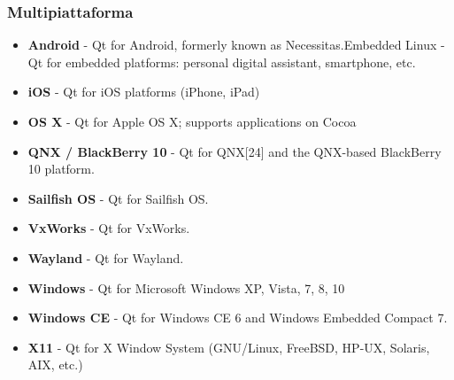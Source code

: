 \documentclass{beamer}
\begin{document}
\begin{frame}
	\frametitle{Multipiattaforma}
	\begin{itemize}
		\item \textbf{Android} - Qt for Android, formerly known as Necessitas.Embedded Linux - Qt for embedded platforms: personal digital assistant, smartphone,
		etc.
		\item \textbf{iOS} - Qt for iOS platforms (iPhone, iPad)
		\item \textbf{OS X} - Qt for Apple OS X; supports applications on Cocoa
		\item \textbf{QNX / BlackBerry 10} - Qt for QNX[24] and the QNX-based BlackBerry 10 platform.
		\item \textbf{Sailfish OS} - Qt for Sailfish OS.
		\item \textbf{VxWorks} - Qt for VxWorks.
		\item \textbf{Wayland} - Qt for Wayland.
		\item \textbf{Windows} - Qt for Microsoft Windows XP, Vista, 7, 8, 10
		\item \textbf{Windows CE} - Qt for Windows CE 6 and Windows Embedded Compact 7.
		\item \textbf{X11} - Qt for X Window System (GNU/Linux, FreeBSD, HP-UX, Solaris, AIX, etc.)
	\end{itemize}
\end{frame}
\end{document}
